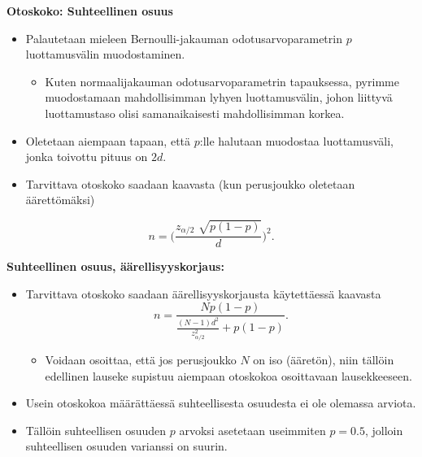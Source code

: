 \documentclass[
]{book}
\providecommand{\tightlist}{%
  \setlength{\itemsep}{0pt}\setlength{\parskip}{0pt}}
\begin{document}
\hfill\break

\textbf{Otoskoko: Suhteellinen osuus}

\begin{itemize}
\tightlist
\item
  Palautetaan mieleen Bernoulli-jakauman odotusarvoparametrin \(p\) luottamusvälin muodostaminen.

  \begin{itemize}
  \tightlist
  \item
    Kuten normaalijakauman odotusarvoparametrin tapauksessa, pyrimme muodostamaan mahdollisimman lyhyen luottamusvälin, johon liittyvä luottamustaso olisi samanaikaisesti mahdollisimman korkea.
  \end{itemize}
\item
  Oletetaan aiempaan tapaan, että \(p\):lle halutaan muodostaa luottamusväli, jonka toivottu pituus on \(2d\).
\item
  Tarvittava otoskoko saadaan kaavasta (kun perusjoukko oletetaan äärettömäksi)
\end{itemize}

\[
n = \Big(\frac{z_{\alpha/2} \,\, \sqrt{p(1-p)}}{d} \Big)^2.
\]

\hfill\break
\hfill\break

\textbf{Suhteellinen osuus, äärellisyyskorjaus:}

\begin{itemize}
\tightlist
\item
  Tarvittava otoskoko saadaan äärellisyyskorjausta käytettäessä kaavasta
  \[
  n = \frac{N p (1-p)}{\frac{(N-1) d^2}{z^2_{\alpha/2}} + p(1-p)}.
  \]

  \begin{itemize}
  \tightlist
  \item
    Voidaan osoittaa, että jos perusjoukko \(N\) on iso (ääretön), niin tällöin edellinen lauseke supistuu aiempaan otoskokoa osoittavaan lausekkeeseen.
  \end{itemize}
\item
  Usein otoskokoa määrättäessä suhteellisesta osuudesta ei ole olemassa arviota.
\item
  Tällöin suhteellisen osuuden \(p\) arvoksi asetetaan useimmiten \(p=0.5\), jolloin suhteellisen osuuden varianssi on suurin.
\end{itemize}

\newpage
\end{document}
